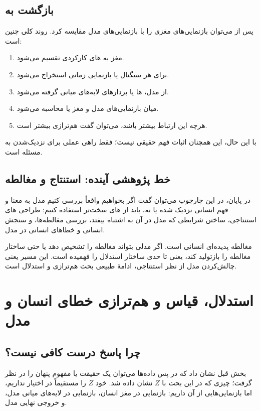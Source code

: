
\subsection{بازگشت به }
پس از  می‌توان بازنمایی‌های مغزی را با بازنمایی‌های مدل مقایسه کرد. روند کلی چنین است:

\begin{enumerate}
  \item مغز به های کارکردی تقسیم می‌شود.
  \item برای هر  سیگنال  یا بازنمایی زمانی استخراج می‌شود.
  \item از مدل، ها یا بردارهای لایه‌های میانی گرفته می‌شود.
  \item میان بازنمایی‌های مدل و مغز  یا  محاسبه می‌شود.
  \item هرچه این ارتباط بیشتر باشد، می‌توان گفت هم‌ترازی بیشتر است.
\end{enumerate}

با این حال، این همچنان اثبات فهم حقیقی نیست؛ فقط راهی عملی برای نزدیک‌شدن به مسئله است.

\subsection{خط پژوهشی آینده: استنتاج و مغالطه}
در پایان، در این چارچوب می‌توان گفت اگر بخواهیم واقعاً بررسی کنیم مدل به معنا و فهم انسانی نزدیک شده یا نه، باید از های سخت‌تر استفاده کنیم: طراحی های استنتاجی، ساختن شرایطی که مدل در آن به اشتباه بیفتد، بررسی مغالطه‌ها، و سنجش  انسانی و خطاهای انسانی در مدل.

مغالطه پدیده‌ای انسانی است. اگر مدلی بتواند مغالطه را تشخیص دهد یا حتی ساختار مغالطه را بازتولید کند، یعنی تا حدی ساختار استدلال را فهمیده است. این مسیر یعنی چالش‌کردن مدل از نظر استنتاجی، ادامهٔ طبیعی بحث هم‌ترازی و استدلال است.

\section{استدلال، قیاس و هم‌ترازی خطای انسان و مدل}

\subsection{چرا پاسخ درست کافی نیست؟}
بخش قبل نشان داد که در پس داده‌ها می‌توان یک حقیقت یا مفهوم پنهان را در نظر گرفت؛ چیزی که در این بحث با \(Z\) نشان داده شد. خود \(Z\) را مستقیماً در اختیار نداریم، اما بازنمایی‌هایی از آن داریم: بازنمایی در مغز انسان، بازنمایی در لایه‌های میانی مدل، و خروجی نهایی مدل.

